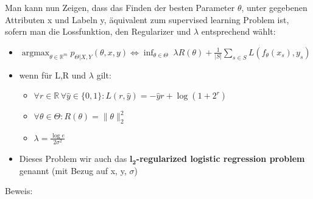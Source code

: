 \documentclass[12pt,a4paper]{article}
\DeclareMathOperator*{\argmax}{argmax}
\newcommand{\nl}{\\[0.1cm]}
\begin{document}
\begin{figure}[H]
\end{figure}
Man kann nun Zeigen, dass das Finden der besten Parameter $\theta$, unter gegebenen Attributen x und Labeln y, äquivalent zum supervised learning Problem ist, sofern man die Lossfunktion, den Regularizer und $\lambda$ entsprechend wählt:\nl
\begin{itemize}
\item $\displaystyle\argmax_{\theta\in\mathbb{R}^m} p_{\Theta|X,Y}(\theta, x, y) \Leftrightarrow \displaystyle \inf_{\theta\in\Theta} \; \lambda R(\theta) + \frac{1}{|S|} \sum_{s\in S} L(f_\theta (x_s), y_s)$
\item wenn für L,R und $\lambda$ gilt:
\begin{itemize}
\item $\forall r\in \mathbb{R}\, \forall \hat{y}\in \{0,1\}: L(r, \hat{y}) = -\hat{y}r+\log(1+2^r)$
\item $\forall \theta\in \Theta: R(\theta) = \|\theta\|^2_2$
\item $\lambda = \frac{\log e}{2\sigma^2}$
\end{itemize}
\item Dieses Problem wir auch das \textbf{$\mathbf{l_2}$-regularized logistic regression problem} genannt (mit Bezug auf x, y, $\sigma$)
\end{itemize}
Beweis:
\end{document}
